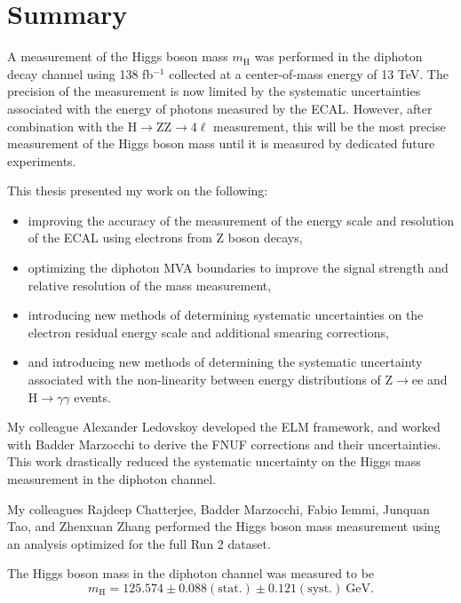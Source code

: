 \chapter{Summary}
\label{chap:summary}


A measurement of the Higgs boson mass $m_\mathrm{H}$ was performed in the diphoton decay channel using 138 fb$^{-1}$ collected at a center-of-mass energy of 13 TeV. The precision of the measurement is now 
limited by the systematic uncertainties associated with the energy of photons measured by the ECAL. However, after combination with the H$\rightarrow$ZZ$\rightarrow$4$\ell$ measurement, this will be the most precise measurement of the Higgs boson mass until it is measured by dedicated future experiments.

This thesis presented my work on the following:
\begin{itemize}
    \item improving the accuracy of the measurement of the energy scale and resolution of the ECAL using electrons from Z boson decays,
    \item optimizing the diphoton MVA boundaries to improve the signal strength and relative resolution of the mass measurement,
    \item introducing new methods of determining systematic uncertainties on the electron residual energy scale and additional smearing corrections,
    \item and introducing new methods of determining the systematic uncertainty associated with the non-linearity between energy distributions of Z$\rightarrow$ee and H$\rightarrow\gamma\gamma$ events. 
\end{itemize}

My colleague Alexander Ledovskoy developed the ELM framework, and worked with Badder Marzocchi to derive the FNUF corrections and their uncertainties. This work drastically reduced the systematic uncertainty on the Higgs mass measurement in the diphoton channel.

My colleagues Rajdeep Chatterjee, Badder Marzocchi, Fabio Iemmi, Junquan Tao, and Zhenxuan Zhang performed the Higgs boson mass measurement using an analysis optimized for the full Run 2 dataset.

The Higgs boson mass in the diphoton channel was measured to be 
\begin{equation*}
    m_{\mathrm{H}} = 125.574 \pm 0.088 (\mathrm{stat.}) \pm 0.121 (\mathrm{syst.}) \mathrm{\ GeV}.
\end{equation*}